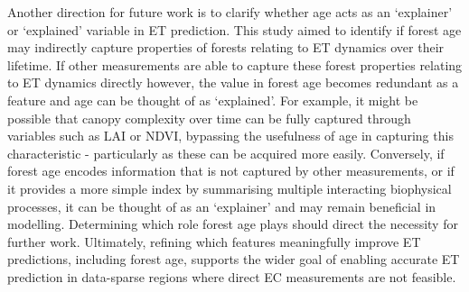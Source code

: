 \par Another direction for future work is to clarify whether age acts as an `explainer' or `explained' variable in ET prediction. This study aimed to identify if forest age may indirectly capture properties of forests relating to ET dynamics over their lifetime. If other measurements are able to capture these forest properties relating to ET dynamics directly however, the value in forest age becomes redundant as a feature and age can be thought of as `explained'. For example, it might be possible that canopy complexity over time can be fully captured through variables such as \ac{LAI} or NDVI, bypassing the usefulness of age in capturing this characteristic - particularly as these can be acquired more easily. Conversely, if forest age encodes information that is not captured by other measurements, or if it provides a more simple index by summarising multiple interacting biophysical processes, it can be thought of as an `explainer' and may remain beneficial in modelling. Determining which role forest age plays should direct the necessity for further work. Ultimately, refining which features meaningfully improve ET predictions, including forest age, supports the wider goal of enabling accurate ET prediction in data-sparse regions where direct EC measurements are not feasible.








